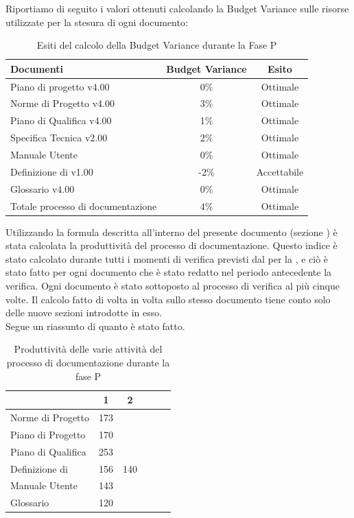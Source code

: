 Riportiamo di seguito i valori ottenuti calcolando la Budget Variance sulle risorse utilizzate per la stesura di ogni documento:
			\begin{table}[H]
					\centering
					\begin{tabu}{| l | c | c |}
							\hline
							Documenti 							& Budget Variance	& Esito		\\ \hline \hline
							
							Piano di progetto v4.00				& 0\% 		& Ottimale  \\ \hline
							Norme di Progetto v4.00 			& 3\%		& Ottimale  \\ \hline
							Piano di Qualifica v4.00 			& 1\%		& Ottimale  \\ \hline
							Specifica Tecnica v2.00 			& 2\%		& Ottimale  \\ \hline
							Manuale Utente  			& 0\%		& Ottimale  \\ \hline
							Definizione di  v1.00 			& -2\%		& Accettabile  \\ \hline
							Glossario v4.00					 	& 0\% 		& Ottimale  \\ \hline
							Totale processo di documentazione & 4\% & Ottimale \\ \hline
						\end{tabu}
					\caption{Esiti del calcolo della Budget Variance durante la Fase P}
				\end{table}
Utilizzando la formula descritta all'interno del presente documento (sezione ) è stata calcolata la produttività del processo di documentazione. Questo indice è stato calcolato durante tutti i momenti di verifica previsti dal  per la , e ciò è stato fatto per ogni documento che è stato redatto nel periodo antecedente la verifica. Ogni documento è stato sottoposto al processo di verifica al più cinque volte. Il calcolo fatto di volta in volta sullo stesso documento tiene conto solo delle nuove sezioni introdotte in esso.\\
Segue un riassunto di quanto è stato fatto.
\begin{table}[H]
      \centering
		\begin{tabu}{| l | c | c | c | c | c |}
		\hline
		&1	&2	\\ \hline
		Norme di Progetto	& 173 &	 \\ \hline
		Piano di Progetto	& 170 &	 \\ \hline
		Piano di Qualifica	& 253 & \\ \hline
		Definizione di  & 156 & 140	 \\ \hline
		Manuale Utente & 143 &   \\ \hline
		Glossario & 120 &  \\ \hline
		\end{tabu}
		\caption{Produttività delle varie attività del processo di documentazione durante la fase P}
\end{table}
